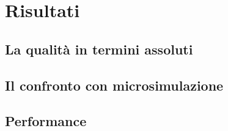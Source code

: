 \chapter{Risultati}
\section{La qualità in termini assoluti}


\section{Il confronto con microsimulazione}


\section{Performance}